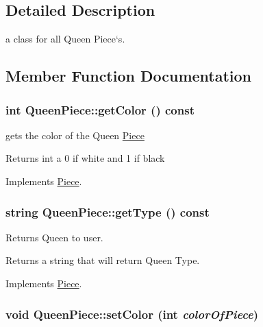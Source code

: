 \subsection{Detailed Description}
a class for all Queen Piece`s. 

\subsection{Member Function Documentation}
\hypertarget{classQueenPiece_a461d58f951b5e9f4d120cec0c47a1d9c}{
\subsubsection[{getColor}]{\setlength{\rightskip}{0pt plus 5cm}int QueenPiece::getColor () const}}
\label{classQueenPiece_a461d58f951b5e9f4d120cec0c47a1d9c}


gets the color of the Queen \hyperlink{classPiece}{Piece} \begin{DoxyReturn}{Returns}
int a 0 if white and 1 if black 
\end{DoxyReturn}


Implements \hyperlink{classPiece_a1376072d4815719e60253ce5688df95c}{Piece}.\hypertarget{classQueenPiece_ae8df61c033b58d7f96e344166a9f2bdb}{
\subsubsection[{getType}]{\setlength{\rightskip}{0pt plus 5cm}string QueenPiece::getType () const}}
\label{classQueenPiece_ae8df61c033b58d7f96e344166a9f2bdb}


Returns Queen to user. \begin{DoxyReturn}{Returns}
a string that will return Queen Type. 
\end{DoxyReturn}


Implements \hyperlink{classPiece_a5b88fcd786bb30b345b24fbc3ab24ab9}{Piece}.\hypertarget{classQueenPiece_a691ff6afc7d167dab9cff0c910cae859}{
\subsubsection[{setColor}]{\setlength{\rightskip}{0pt plus 5cm}void QueenPiece::setColor (int {\em colorOfPiece})}}
\label{classQueenPiece_a691ff6afc7d167dab9cff0c910cae859}


